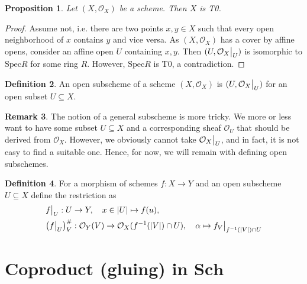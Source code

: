 \documentclass{scrartcl}
\newcommand{\Sch}{\mathrm{\textbf{Sch}}}
\newcommand{\Spec}{\mathrm{Spec}}
\renewcommand{\O}{\mathcal{O}}
\newcommand\restr[2]{{
    \left.\kern-\nulldelimiterspace
    #1
    \vphantom{\big|}
    \right|_{#2}
}}
\newtheorem{prop}{Proposition}[section]
\theoremstyle{definition}
\newtheorem{definition}[prop]{Definition}
\newtheorem{remark}[prop]{Remark}
\begin{document}
\begin{prop}
    Let $(X, \O_X)$ be a scheme. Then $X$ is T0.
\end{prop}
\begin{proof}
    Assume not, i.e. there are two points $x, y \in X$ such that every open neighborhood of $x$ contains $y$ and vice versa.
    As $(X, \O_X)$ has a cover by affine opens, consider an affine open $U$ containing $x, y$.
    Then $(U, \restr{\O_X}{U})$ is isomorphic to $\Spec R$ for some ring $R$.
    However, $\Spec R$ is T0, a contradiction. 
\end{proof}
\begin{definition}
    An open subscheme of a scheme $(X, \O_X)$ is $(U, \restr{\O_X}{U})$ for an open subset $U \subseteq X$.
\end{definition}
\begin{remark}
    The notion of a general subscheme is more tricky.
    We more or less want to have some subset $U \subseteq X$ and a corresponding sheaf $\O_U$ that should be derived from $\O_X$.
    However, we obviously cannot take $\restr{\O_X}{U}$, and in fact, it is not easy to find a suitable one.
    Hence, for now, we will remain with defining open subschemes. 
\end{remark}
\begin{definition}
    For a morphism of schemes $f: X \to Y$ and an open subscheme $U \subseteq X$ define the restriction as
    \begin{align*}
        &\restr{f}{U}: U \to Y, \quad x \in |U| \mapsto f(u), \\
        &\bigl(\restr{f}{U}\bigr)^\#_V: \O_Y(V) \to \O_X(f^{-1}(|V|) \cap U), \quad \alpha \mapsto \restr{f_V}{f^{-1}(|V|) \cap U}
    \end{align*}
\end{definition}

\section{Coproduct (gluing) in $\Sch$}
\end{document}
